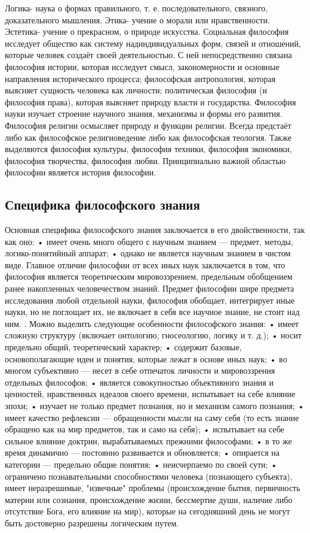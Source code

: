 \documentclass[12pt]{article}
\begin{document}
Логика- наука о формах правильного, т. е. последовательного, связного, доказательного мышления.
Этика- учение о морали или нравственности.
Эстетика- учение о прекрасном, о природе искусства.
Социальная  философия  исследует  общество  как  систему  надиндивидуальных  форм,  связей  и  отношений,
которые человек создаёт своей деятельностью. С ней непосредственно связана философия истории, которая
исследует  смысл,  закономерности  и  основные  направления  исторического  процесса;  философская
антропология,  которая  выясняет  сущность  человека  как  личности;  политическая  философия  (и  философия
права), которая выясняет природу власти и государства. Философия науки изучает строение научного знания,
механизмы  и  формы  его  развития.  Философия  религии  осмысляет  природу  и  функции  религии.  Всегда
предстаёт  либо  как  философское  религиоведение  либо  как  философская  теология.  Также  выделяются
философия культуры, философия техники, философия экономики, философия творчества, философия любви. 
Принципиально важной областью философии является история философии.
\subsection{Специфика философского знания}
Основная специфика философского знания заключается в его двойственности, так как оно:
• имеет очень много общего с научным знанием — предмет, методы, логико-понятийный аппарат;
• однако не является научным знанием в чистом виде.
Главное отличие философии от всех иных наук заключается в том, что философия является теоретическим
мировоззрением, предельным обобщением ранее накопленных человечеством знаний.
Предмет философии шире предмета исследования любой отдельной науки, философия обобщает, интегрирует
иные науки, но не поглощает их, не включает в себя все научное знание, не стоит над ним.
. Можно выделить следующие особенности философского знания:
• имеет сложную структуру (включает онтологию, гносеологию, логику и т. д.);
• носит предельно общий, теоретический характер;
• содержит базовые, основополагающие идеи и понятия, которые лежат в основе иных наук;
• во многом субъективно — несет в себе отпечаток личности и мировоззрения отдельных философов;
•  является  совокупностью  объективного  знания  и  ценностей,  нравственных  идеалов  своего  времени,
испытывает на себе влияние эпохи;
• изучает не только предмет познания, но и механизм самого познания;
•  имеет  качество  рефлексии  —  обращенности  мысли  на  саму  себя  (то  есть  знание  обращено  как  на  мир
предметов, так и само на себя);
• испытывает на себе сильное влияние доктрин, вырабатываемых прежними философами;
• в то же время динамично — постоянно развивается и обновляется;
• опирается на категории — предельно общие понятия;
• неисчерпаемо по своей сути;
•  ограничено  познавательными  способностями  человека  (познающего  субъекта),  имеет  неразрешимые,
"извечные"  проблемы  (происхождение  бытия,  первичность  материи  или  сознания,  происхождение  жизни,
бессмертие души, наличие либо отсутствие Бога, его влияние на мир), которые на сегодняшний день не могут
быть достоверно разрешены логическим путем.
\end{document}
